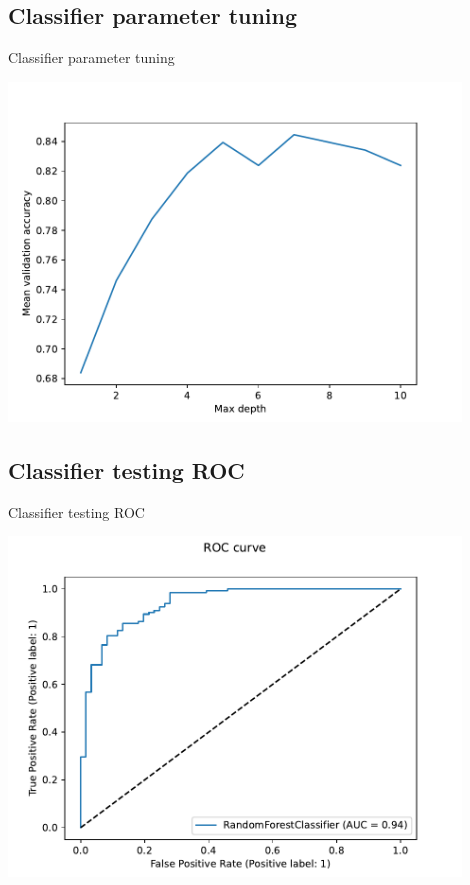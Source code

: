 \documentclass{beamer}
\begin{document}
\subsection{Classifier parameter tuning}
\begin{frame}{Classifier parameter tuning}

\includegraphics[width=0.9\textwidth]{../outputs/forest_classifier_validation.pdf}
    
\end{frame}
    

\subsection{Classifier testing ROC}
\begin{frame}{Classifier testing ROC}

\includegraphics[width=0.9\textwidth]{../outputs/test_classification_plot.pdf}
    
\end{frame}
    
\end{document}
